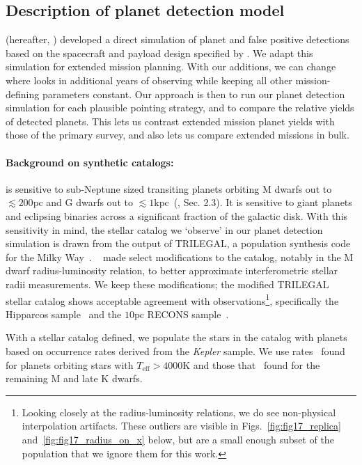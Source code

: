 \subsection{Description of planet detection model}
\label{sec:planet_detection_model}

\citet{Sullivan_2015} (hereafter, ) developed a direct simulation of \tesss planet and false positive detections based on the spacecraft and payload design specified by \citet{ricker_transiting_2014}. 
We adapt this simulation for extended mission planning.
With our additions, we can change where \tess looks in additional years of observing while keeping all other mission-defining parameters constant. 
Our approach is then to run our planet detection simulation for each plausible pointing strategy, and to compare the relative yields of detected planets.
This lets us contrast extended mission planet yields with those of the primary survey, and also lets us compare extended missions in bulk.

\paragraph{Background on synthetic catalogs:}
\tess is sensitive to sub-Neptune sized transiting planets orbiting M dwarfs out to $\lesssim200\text{pc}$ and G dwarfs out to $\lesssim1\text{kpc}$~(, Sec. 2.3). 
It is sensitive to giant planets and eclipsing binaries across a significant fraction of the galactic disk.
With this sensitivity in mind, the stellar catalog we `observe' in our planet detection simulation is drawn from the output of TRILEGAL, a population synthesis code for the Milky Way~\citep{girardi_star_2005}.
~ made select modifications to the catalog, notably in the M dwarf radius-luminosity relation, to better approximate interferometric stellar radii measurements.
We keep these modifications; the modified TRILEGAL stellar catalog shows acceptable agreement with observations\footnote{Looking closely at the radius-luminosity relations, we do see non-physical interpolation artifacts. These outliers are visible in Figs.~\ref{fig:fig17_replica} and~\ref{fig:fig17_radius_on_x} below, but are a small enough subset of the population that we ignore them for this work.}, specifically the Hipparcos sample~\citep{perryman_hipparcos_1997,van_leeuwen_validation_2007} and the $10\text{pc}$ RECONS sample~\citep{henry_solar_2006}.

With a stellar catalog defined, we populate the stars in the catalog with planets based on occurrence rates derived from the \textit{Kepler} sample. 
We use rates~\citet{fressin_false_2013} found for planets orbiting stars with $T_\text{eff} > 4000\text{K}$ and those that~\citet{dressing_occurrence_2015} found for the remaining M and late K dwarfs.

